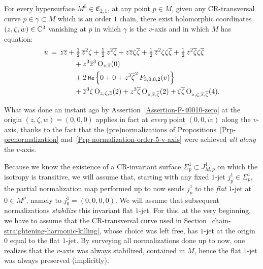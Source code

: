 \documentclass[12pt,twoside,leqno,openany]{amsart}
\begin{document}
\begin{Proposition}
\label{Prp-full-normalization-order-5-v-axis}
For every hypersurface $M^5 \in \mathfrak{C}_{2,1}$, 
at any point $p \in M$, 
given any CR-transversal curve $p \in \gamma \subset M$
which is an order $1$ chain,
there exist holomorphic coordinates $(z, \zeta, w) \in \mathbb{C}^3$
vanishing at $p$ in which $\gamma$ is the $v$-axis and in which
$M$ has equation:
\[
\aligned
u
&
\,=\,
z\overline{z}
+
\tfrac{1}{2}\,\overline{z}^2\zeta
+
\tfrac{1}{2}\,z^2\overline{\zeta}
+
z\overline{z}\zeta\overline{\zeta}
+
\tfrac{1}{2}\,\overline{z}^2\zeta\zeta\overline{\zeta}
+
\tfrac{1}{2}\,z^2\overline{\zeta}\zeta\overline{\zeta}
\\
&
\ \ \ \ \ \ \ \ \ \ \ 
+
z^3\overline{z}^3\,
{\rm O}_{z,\overline{z}}(0)
\\
&
\ \ \ \ \ \ \ \ \ \ \ 
+
2\,\Re\,
\Big\{
0
+
0
+
z^3\overline{\zeta}^2\,
F_{3,0,0,2}(v)
\Big\}
\\
&
\ \ \ \ \ \ \ \ \ \ \ 
+
\overline{z}^3\zeta\,
{\rm O}_{z,\zeta,\overline{z}}(2)
+
z^3\overline{\zeta}\,
{\rm O}_{z,\overline{z},\overline{\zeta}}(2)
+
\zeta\overline{\zeta}\,
{\rm O}_{z,\zeta,\overline{z},\overline{\zeta}}(4).
\endaligned
\]
\end{Proposition}

\proof
What was done an instant ago
by Assertion~{\ref{Assertion-F-40010-zero}} 
at the origin $(z, \zeta, w) = (0, 0, 0)$
applies in fact at {\em every} point $(0, 0, iv)$ along the
$v$-axis, thanks to the fact that the
(pre)normalizations
of Propositions~{\ref{Prp-prenormalization}}
and~{\ref{Prp-normalization-order-5-v-axis}}
were achieved {\em all along} the $v$-axis.
\endproof

Because we know the existence of a CR-invariant
surface $\Sigma_p^1 \subset J_{M,p}^1$ on which
the isotropy is transitive, we will assume
that, starting with any fixed $1$-jet $j_p^1 \in \Sigma_p^1$,
the partial normalization map performed up to now
sends $j_p^1$ to the {\em flat} $1$-jet at
$0 \in M^p$, namely to $j_0^1 = (0, 0, 0, 0)$. 
We will assume that subsequent normalizations
{\em stabilize} this invariant flat $1$-jet.
For this, at the very beginning, we have to assume that
the CR-transversal curve used in 
Section~{\ref{chain-straightening-harmonic-killing}},
whose choice was left free, has $1$-jet at the origin $0$
equal to the flat $1$-jet.
By surveying all normalizations done up to now,
one realizes that the $v$-axis was always stabilized,
contained in $M$, hence the flat $1$-jet was
always preserved (implicitly). 
\end{document}
